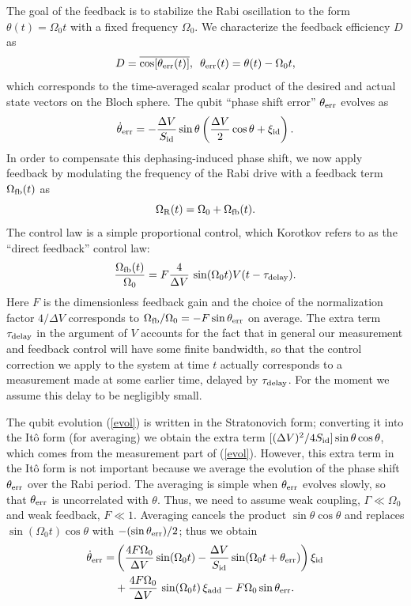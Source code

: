 The goal of the feedback is to stabilize the Rabi oscillation to the form $\theta(t)=\Omega_0 t$ with a fixed frequency $\Omega_0$. We characterize the feedback efficiency $D$ \cite{korotkov_dir_fb} as
\begin{equation}
D=\overline{\cos [\theta_{\rm err}(t)]}, \,\,\, \theta_{\rm err}(t) = \theta(t)-\Omega_0 t,
\end{equation}
which corresponds to the time-averaged scalar product of the desired and actual state vectors on the Bloch sphere.  The qubit ``phase shift error'' $\theta_{\rm err}$ evolves as \cite{korotkov_dir_fb}
\begin{equation}
\dot\theta_{\rm err} = -\frac{\Delta V}{S_{\rm id}} \sin \theta \left(\frac{\Delta V}{2}\cos \theta +\xi_{\rm id}\right).
\label{evol}
\end{equation}
In order to compensate this dephasing-induced phase shift, we now apply feedback by modulating the frequency of the Rabi drive with a feedback term $\Omega_{\rm fb}(t)$ as
\begin{equation}
\Omega_{\rm R}(t) =\Omega_0+\Omega_{\rm fb} (t).
\label{fb0}
\end{equation}
The control law is a simple proportional control, which Korotkov refers to as the ``direct feedback'' control law:
\begin{equation}
\frac{\Omega_{\rm fb}(t)}{\Omega_0} = F \frac{4}{\Delta V} \,\sin (\Omega_0 t) V(t - \tau_{\rm delay}).
\label{fb}
\end{equation}
Here $F$ is the dimensionless feedback gain and the choice of the normalization factor $4/\Delta V$ corresponds to $\Omega_{\rm fb}/\Omega_0=-F\sin\theta_{\rm err}$ on average.  The extra term $\tau_{\rm delay}$ in the argument of $V$ accounts for the fact that in general our measurement and feedback control will have some finite bandwidth, so that the control correction we apply to the system at time $t$ actually corresponds to a measurement made at some earlier time, delayed by $\tau_{\rm delay}$.  For the moment we assume this delay to be negligibly small.

The qubit evolution (\ref{evol}) is written in the Stratonovich form; converting it into the It\^o form (for averaging) we obtain the extra term $[(\Delta V)^2/4S_{\rm id}]\sin\theta\cos\theta$, which comes from the measurement part of (\ref{evol}). However, this extra term in the It\^o form is not important because we average the evolution of the phase shift $\theta_{\rm err}$ over the Rabi period. The averaging is simple when $\theta_{\rm err}$ evolves slowly, so that $\theta_{\rm err}$ is uncorrelated with $\theta$. Thus, we need to assume weak coupling, $\Gamma \ll \Omega_0$ and weak feedback, $F\ll 1$. Averaging cancels the product $\sin\theta\cos\theta$ and replaces $\sin(\Omega_0 t)\cos\theta$ with $-(\sin\theta_{\rm err} )/2$; thus we obtain
\begin{align}
\dot\theta_{\rm err} = &\left( \frac{4F\Omega_0}{\Delta V} \sin(\Omega_0 t) -\frac{\Delta V}{S_{\rm id}} \sin (\Omega_0 t+\theta_{\rm err}) \right) \xi_{\rm id} \notag \\
&+ \frac{4F\Omega_0}{\Delta V} \, \sin (\Omega_0 t) \,    \xi_{\rm add}  -F\Omega_0 \sin\theta_{\rm err}.
\label{evol-main}
\end{align}

